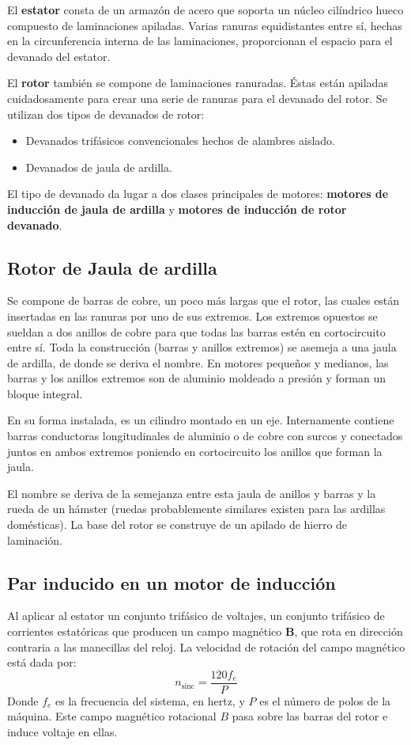 \documentclass[a4paper,12pt]{article}
\newcommand{\mrm}{\mathrm}
\begin{document}
El \textbf{estator} consta de un armazón de acero que soporta un núcleo cilíndrico hueco compuesto de laminaciones apiladas. Varias ranuras equidistantes entre sí, hechas en la circunferencia interna de las laminaciones, proporcionan el espacio para el devanado del estator.

El \textbf{rotor} también se compone de laminaciones ranuradas. Éstas están apiladas cuidadosamente para crear una serie de ranuras para el devanado del rotor. Se utilizan dos tipos de devanados de rotor:
\begin{itemize}
    \item Devanados trifásicos convencionales hechos de alambres aislado.
    \item Devanados de jaula de ardilla.
\end{itemize}
El tipo de devanado da lugar a dos clases principales de motores: \textbf{motores de inducción de jaula de ardilla} y \textbf{motores de inducción de rotor devanado}.
\subsection{Rotor de Jaula de ardilla}
Se compone de barras de cobre, un poco más largas que el rotor, las cuales están insertadas en las ranuras por uno de sus extremos. Los extremos opuestos se sueldan a dos anillos de cobre para que todas las barras estén en cortocircuito entre sí. Toda la construcción (barras y anillos extremos) se asemeja a una jaula de ardilla, de donde se deriva el nombre. En motores pequeños y medianos, las barras y los anillos extremos son de aluminio moldeado a presión y forman un bloque integral.

En su forma instalada, es un cilindro montado en un eje. Internamente contiene barras conductoras longitudinales de aluminio o de cobre con surcos y conectados juntos en ambos extremos poniendo en cortocircuito los anillos que forman la jaula.

El nombre se deriva de la semejanza entre esta jaula de anillos y barras y la rueda de un hámster (ruedas probablemente similares existen para las ardillas domésticas). La base del rotor se construye de un apilado de hierro de laminación.
\subsection{Par inducido en un motor de inducción}
Al aplicar al estator un conjunto trifásico de voltajes, un conjunto trifásico de corrientes estatóricas que producen un campo magnético \textbf{B}, que rota en dirección contraria a las manecillas del reloj. La velocidad de rotación del campo magnético está dada por:
\begin{equation}
    n_{\mrm{sinc}} = \frac{120f_{e}}{P}
\end{equation}
Donde $f_{e}$ es la frecuencia del sistema, en hertz, y $P$ es el número de polos de la máquina. Este campo magnético rotacional $B$ pasa sobre las barras del rotor e induce voltaje en ellas.
\end{document}
